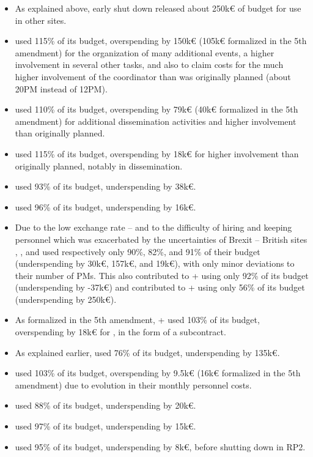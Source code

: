 \begin{itemize}
\item As explained above,  early shut down released about
  250k€ of budget for use in other sites.
\item {} used 115\% of its budget, overspending by 150k€ (105k€
  formalized in the 5th amendment) for the organization of many
  additional events, a higher involvement in several other tasks, and
  also to claim costs for the much higher involvement of the
  coordinator than was originally planned (about 20PM instead of
  12PM).
\item {} used 110\% of its budget, overspending by 79k€ (40k€
  formalized in the 5th amendment) for additional dissemination
  activities and higher involvement than originally planned.
\item {} used 115\% of its budget, overspending by 18k€ for
  higher involvement than originally planned, notably in
  dissemination.
\item {} used 93\% of its budget, underspending by 38k€.
\item {} used 96\% of its budget, underspending by 16k€.
\item Due to the low exchange rate -- and to the difficulty of hiring
  and keeping personnel which was exacerbated by the uncertainties of
  Brexit -- British sites , , and  used
  respectively only 90\%, 82\%, and 91\% of their budget
  (underspending by 30k€, 157k€, and 19k€), with only minor deviations
  to their number of PMs. This also contributed to
  + using only 92\% of its budget (underspending
  by -37k€) and contributed to + using only 56\%
  of its budget (underspending by 250k€).
\item As formalized in the 5th amendment, + used
  103\% of its budget, overspending by 18k€ for
  , in the form of a subcontract.
\item As explained earlier,  used 76\% of its budget,
  underspending by 135k€.
\item {} used 103\% of its budget, overspending by 9.5k€ (16k€
  formalized in the 5th amendment) due to evolution in their monthly
  personnel costs.
\item {} used 88\% of its budget, underspending by 20k€.
\item {} used 97\% of its budget, underspending by 15k€.
\item {} used 95\% of its budget, underspending by 8k€, before
  shutting down in RP2.
\end{itemize}


